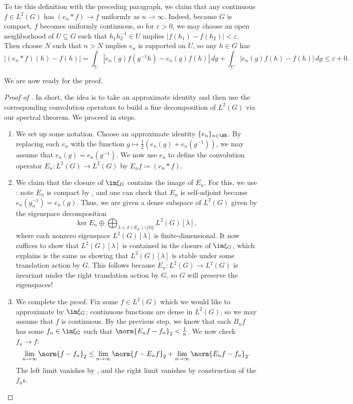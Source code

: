 \documentclass{amsart}
\begin{document}
\begin{remark} \label{rem:approx-id-uniform}
	To tie this definition with the preceding paragraph, we claim that any continuous $f\in L^2(G)$ has $(e_n*f)\to f$ uniformly as $n\to\infty$. Indeed, because $G$ is compact, $f$ becomes uniformly continuous, so for $\varepsilon>0$, we may choose an open neighborhood of $U\subseteq G$ such that $h_1h_2^{-1}\in U$ implies $\left|f(h_1)-f(h_2)\right|<\varepsilon$. Then choose $N$ such that $n>N$ implies $e_n$ is supported on $U$, so any $h\in G$ has
	\[\left|(e_n*f)(h)-f(h)\right|=\int_U\left|e_n(g)f\left(g^{-1}h\right)-e_n(g)f(h)\right|\,dg+\int_U\left|e_n(g)f(h)-f(h)\right|\,dg\le\varepsilon+0.\]
\end{remark}
We are now ready for the proof.
\begin{proof}[Proof of ]
	In short, the idea is to take an approximate identity and then use the corresponding convolution operators to build a fine decomposition of $L^2(G)$ via our spectral theorem.
	We proceed in steps.
	\begin{enumerate}
		\item We set up some notation. Choose an approximate identity $\{e_n\}_{n\in\NN}$. By replacing each $e_n$ with the function $g\mapsto\frac12\left(e_n(g)+e_n(g^{-1})\right)$, we may assume that $e_n(g)=e_n\left(g^{-1}\right)$. We now use $e_n$ to define the convolution operator $E_n\colon L^2(G)\to L^2(G)$ by $E_nf\coloneqq(e_n*f)$.
		\item We claim that the closure of $\im\xi_G$ contains the image of $E_n$. For this, we use : note $E_n$ is compact by , and one can check that $E_n$ is self-adjoint because $e_n\left(g_n^{-1}\right)=e_n(g)$. Thus, we are given a dense subspace of $L^2(G)$ given by the eigenspace decomposition
		\[\ker E_n\oplus\bigoplus_{\lambda\in\sigma(E_n)\setminus\{0\}}L^2(G)[\lambda],\]
		where each nonzero eigenspace $L^2(G)[\lambda]$ is finite-dimensional. It now suffices to show that $L^2(G)[\lambda]$ is contained in the closure of $\im\xi_G$, which  explains is the same as showing that $L^2(G)[\lambda]$ is stable under some translation action by $G$. This follows because $E_n\colon L^2(G)\to L^2(G)$ is invariant under the right translation action by $G$, so $G$ will preserve the eigenspaces!
		\item We complete the proof. Fix some $f\in L^2(G)$ which we would like to approximate by $\im\xi_G$; continuous functions are dense in $L^2(G)$, so we may assume that $f$ is continuous. By the previous step, we know that each $B_nf$ has some $f_n\in\im\xi_G$ such that $\norm{E_nf-f_n}_2<\frac1n$. We now check $f_n\to f$:
		\[\lim_{n\to\infty}\norm{f-f_n}_2\le\lim_{n\to\infty}\norm{f-E_nf}_2+\lim_{n\to\infty}\norm{E_nf-f_n}_2.\]
		The left limit vanishes by , and the right limit vanishes by construction of the $f_n$s.
		\qedhere
	\end{enumerate}
\end{proof}
\end{document}
